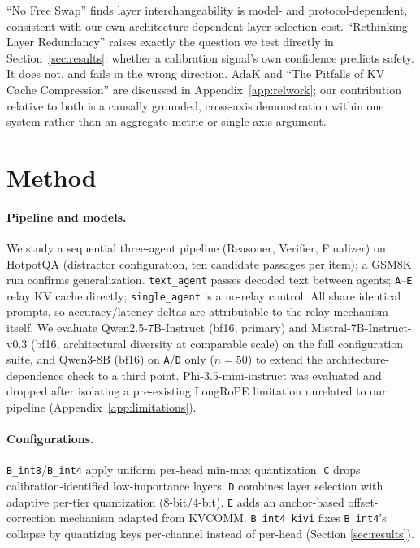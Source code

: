 \documentclass[11pt]{article}
\begin{document}
``No Free Swap'' \citep{nofreeswap2026} finds layer interchangeability
is model- and protocol-dependent, consistent with our own
architecture-dependent layer-selection cost. ``Rethinking Layer
Redundancy'' \citep{rethinkredundancy2026} raises exactly the question
we test directly in Section~\ref{sec:results}: whether a calibration
signal's own confidence predicts safety. It does not, and fails in the
wrong direction. AdaK \citep{adak2026} and ``The Pitfalls of KV Cache
Compression'' \citep{pitfallskv2026} are discussed in
Appendix~\ref{app:relwork}; our contribution relative to both is a
causally grounded, cross-axis demonstration within one system rather
than an aggregate-metric or single-axis argument.

\section{Method}
\label{sec:method}

\paragraph{Pipeline and models.} We study a sequential three-agent
pipeline (Reasoner, Verifier, Finalizer) on HotpotQA
\citep{hotpotqa2018} (distractor configuration, ten candidate passages
per item); a GSM8K \citep{gsm8k2021} run confirms generalization.
\texttt{text\_agent} passes decoded text between agents;
\texttt{A}--\texttt{E} relay KV cache directly; \texttt{single\_agent}
is a no-relay control. All share identical prompts, so accuracy/latency
deltas are attributable to the relay mechanism itself. We evaluate
Qwen2.5-7B-Instruct \citep{qwen2p5_2024} (bf16, primary) and
Mistral-7B-Instruct-v0.3 \citep{mistral7b2023} (bf16, architectural
diversity at comparable scale) on the full configuration suite, and
Qwen3-8B (bf16) on \texttt{A}/\texttt{D} only ($n=50$) to extend the
architecture-dependence check to a third point. Phi-3.5-mini-instruct
was evaluated and dropped after isolating a pre-existing LongRoPE
limitation unrelated to our pipeline (Appendix~\ref{app:limitations}).

\paragraph{Configurations.} \texttt{B\_int8}/\texttt{B\_int4} apply
uniform per-head min-max quantization. \texttt{C} drops
calibration-identified low-importance layers. \texttt{D} combines
layer selection with adaptive per-tier quantization (8-bit/4-bit).
\texttt{E} adds an anchor-based offset-correction mechanism adapted
from KVCOMM. \texttt{B\_int4\_kivi} fixes \texttt{B\_int4}'s collapse by
quantizing keys per-channel instead of per-head (Section
\ref{sec:results}).
\end{document}
